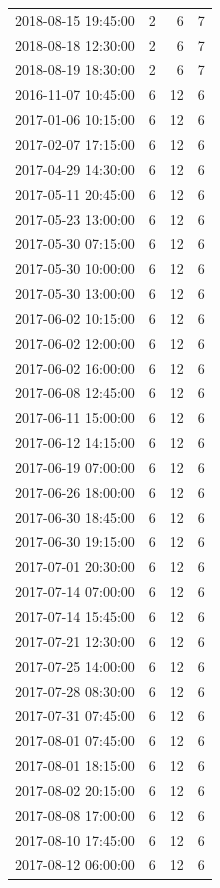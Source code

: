 \begin{tabular}{lrrr}
2018-08-15 19:45:00 & 2 & 6 & 7 \\
2018-08-18 12:30:00 & 2 & 6 & 7 \\
2018-08-19 18:30:00 & 2 & 6 & 7 \\
2016-11-07 10:45:00 & 6 & 12 & 6 \\
2017-01-06 10:15:00 & 6 & 12 & 6 \\
2017-02-07 17:15:00 & 6 & 12 & 6 \\
2017-04-29 14:30:00 & 6 & 12 & 6 \\
2017-05-11 20:45:00 & 6 & 12 & 6 \\
2017-05-23 13:00:00 & 6 & 12 & 6 \\
2017-05-30 07:15:00 & 6 & 12 & 6 \\
2017-05-30 10:00:00 & 6 & 12 & 6 \\
2017-05-30 13:00:00 & 6 & 12 & 6 \\
2017-06-02 10:15:00 & 6 & 12 & 6 \\
2017-06-02 12:00:00 & 6 & 12 & 6 \\
2017-06-02 16:00:00 & 6 & 12 & 6 \\
2017-06-08 12:45:00 & 6 & 12 & 6 \\
2017-06-11 15:00:00 & 6 & 12 & 6 \\
2017-06-12 14:15:00 & 6 & 12 & 6 \\
2017-06-19 07:00:00 & 6 & 12 & 6 \\
2017-06-26 18:00:00 & 6 & 12 & 6 \\
2017-06-30 18:45:00 & 6 & 12 & 6 \\
2017-06-30 19:15:00 & 6 & 12 & 6 \\
2017-07-01 20:30:00 & 6 & 12 & 6 \\
2017-07-14 07:00:00 & 6 & 12 & 6 \\
2017-07-14 15:45:00 & 6 & 12 & 6 \\
2017-07-21 12:30:00 & 6 & 12 & 6 \\
2017-07-25 14:00:00 & 6 & 12 & 6 \\
2017-07-28 08:30:00 & 6 & 12 & 6 \\
2017-07-31 07:45:00 & 6 & 12 & 6 \\
2017-08-01 07:45:00 & 6 & 12 & 6 \\
2017-08-01 18:15:00 & 6 & 12 & 6 \\
2017-08-02 20:15:00 & 6 & 12 & 6 \\
2017-08-08 17:00:00 & 6 & 12 & 6 \\
2017-08-10 17:45:00 & 6 & 12 & 6 \\
2017-08-12 06:00:00 & 6 & 12 & 6 \\

\end{tabular}
